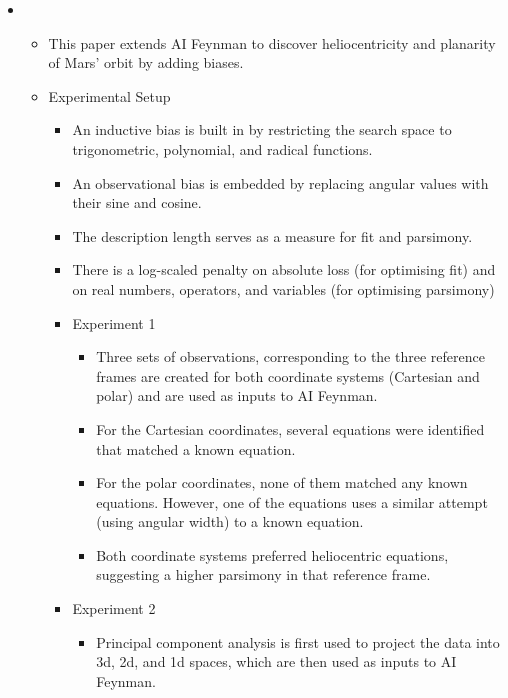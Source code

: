 \documentclass[fleqn,10pt]{olplainarticle}
\begin{document}
\begin{itemize}
    \item {}
          \begin{itemize}
              \item This paper extends AI Feynman to discover heliocentricity and planarity of Mars' orbit by adding biases.
              \item Experimental Setup
                    \begin{itemize}
                        \item An inductive bias is built in by restricting the search space to trigonometric, polynomial, and radical functions.
                        \item An observational bias is embedded by replacing angular values with their sine and cosine.
                        \item The description length serves as a measure for fit and parsimony.
                        \item There is a log-scaled penalty on absolute loss (for optimising fit) and on real numbers, operators, and variables (for optimising parsimony)
                        \item Experiment 1
                              \begin{itemize}
                                  \item Three sets of observations, corresponding to the three reference frames are created for both coordinate systems (Cartesian and polar) and are used as inputs to AI Feynman.
                                  \item For the Cartesian coordinates, several equations were identified that matched a known equation.
                                  \item For the polar coordinates, none of them matched any known equations. However, one of the equations uses a similar attempt (using angular width) to a known equation.
                                  \item Both coordinate systems preferred heliocentric equations, suggesting a higher parsimony in that reference frame.
                              \end{itemize}
                        \item Experiment 2
                            \begin {itemize}
                                \item Principal component analysis is first used to project the data into 3d, 2d, and 1d spaces, which are then used as inputs to AI Feynman.

\end{itemize}
\end{itemize}
\end{itemize}
\end{itemize}
\end{document}
